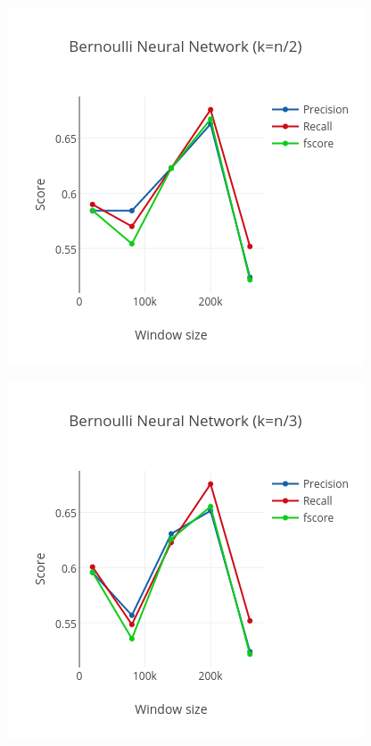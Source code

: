 \documentclass[letterpaper,11pt]{article}
\begin{document}
\begin{figure}
\begin{minipage}{.45\linewidth}
  \label{fig:adr3}
\end{minipage}
\begin{minipage}{.45\linewidth}
  \includegraphics[width=\linewidth]{../data_mapred/img/truncated/bnn2.png}
  \label{fig:bnn2}
\end{minipage}
\begin{minipage}{.45\linewidth}
  \includegraphics[width=\linewidth]{../data_mapred/img/truncated/bnn3.png}

\end{minipage}
\end{figure}
\end{document}
